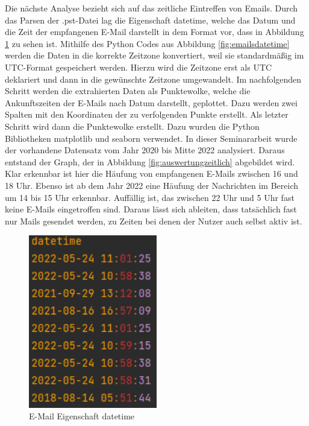 Die nächste Analyse bezieht sich auf das zeitliche Eintreffen von Emails. Durch das Parsen der .pst-Datei lag die Eigenschaft \glqq{}datetime\grqq, welche das Datum und die Zeit der empfangenen E-Mail darstellt in dem Format vor, dass in Abbildung \ref{fig:datetime} zu sehen ist. Mithilfe des Python Codes aus Abbildung \ref{fig:emailsdatetime} werden die Daten in die korrekte Zeitzone konvertiert, weil sie standardmäßig im UTC-Format gespeichert werden. Hierzu wird die Zeitzone erst als UTC deklariert und dann in die gewünschte Zeitzone umgewandelt. Im nachfolgenden Schritt werden die extrahierten Daten als Punktewolke, welche die Ankunftszeiten der E-Mails nach Datum darstellt, geplottet. Dazu werden zwei Spalten mit den Koordinaten der zu verfolgenden Punkte erstellt. Als letzter Schritt wird dann die Punktewolke erstellt. Dazu wurden die Python Bibliotheken \glqq{}matplotlib\grqq{} und \glqq{}seaborn\grqq{} verwendet. In dieser Seminararbeit wurde der vorhandene Datensatz vom Jahr 2020 bis Mitte 2022 analysiert. Daraus entstand der Graph, der in Abbildung \ref{fig:auswertungzeitlich} abgebildet wird. Klar erkennbar ist hier die Häufung von empfangenen E-Mails zwischen 16 und 18 Uhr. Ebenso ist ab dem Jahr 2022 eine Häufung der Nachrichten im Bereich um 14 bis 15 Uhr erkennbar. Auffällig ist, das zwischen 22 Uhr und 5 Uhr fast keine E-Mails eingetroffen sind. Daraus lässt sich ableiten, dass tatsächlich fast nur Mails gesendet werden, zu Zeiten bei denen der Nutzer auch selbst aktiv ist.

\begin{figure}
    \centering
    \includegraphics[width=0.50\textwidth]{images/datetime.PNG}
    \caption{E-Mail Eigenschaft datetime} 
    \label{fig:datetime}
\end{figure}


